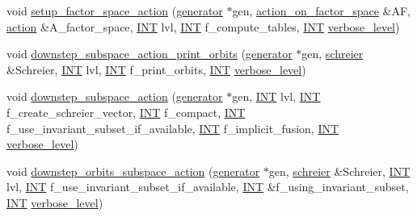 \begin{DoxyCompactItemize}
\item 
void \mbox{\hyperlink{classoracle_a181e076f112ba1f32f5fb4e8abebdb18}{setup\+\_\+factor\+\_\+space\+\_\+action}} (\mbox{\hyperlink{classgenerator}{generator}} $\ast$gen, \mbox{\hyperlink{classaction__on__factor__space}{action\+\_\+on\+\_\+factor\+\_\+space}} \&AF, \mbox{\hyperlink{classaction}{action}} \&A\+\_\+factor\+\_\+space, \mbox{\hyperlink{galois_8h_a09fddde158a3a20bd2dcadb609de11dc}{I\+NT}} lvl, \mbox{\hyperlink{galois_8h_a09fddde158a3a20bd2dcadb609de11dc}{I\+NT}} f\+\_\+compute\+\_\+tables, \mbox{\hyperlink{galois_8h_a09fddde158a3a20bd2dcadb609de11dc}{I\+NT}} \mbox{\hyperlink{simeon_8_c_a818073fbcc2f439e7c56952f67386122}{verbose\+\_\+level}})
\item 
void \mbox{\hyperlink{classoracle_aa23545cebae0fe4f46a689641c775c92}{downstep\+\_\+subspace\+\_\+action\+\_\+print\+\_\+orbits}} (\mbox{\hyperlink{classgenerator}{generator}} $\ast$gen, \mbox{\hyperlink{classschreier}{schreier}} \&Schreier, \mbox{\hyperlink{galois_8h_a09fddde158a3a20bd2dcadb609de11dc}{I\+NT}} lvl, \mbox{\hyperlink{galois_8h_a09fddde158a3a20bd2dcadb609de11dc}{I\+NT}} f\+\_\+print\+\_\+orbits, \mbox{\hyperlink{galois_8h_a09fddde158a3a20bd2dcadb609de11dc}{I\+NT}} \mbox{\hyperlink{simeon_8_c_a818073fbcc2f439e7c56952f67386122}{verbose\+\_\+level}})
\item 
void \mbox{\hyperlink{classoracle_a26f568b84b1ca2c24f619278ac88c407}{downstep\+\_\+subspace\+\_\+action}} (\mbox{\hyperlink{classgenerator}{generator}} $\ast$gen, \mbox{\hyperlink{galois_8h_a09fddde158a3a20bd2dcadb609de11dc}{I\+NT}} lvl, \mbox{\hyperlink{galois_8h_a09fddde158a3a20bd2dcadb609de11dc}{I\+NT}} f\+\_\+create\+\_\+schreier\+\_\+vector, \mbox{\hyperlink{galois_8h_a09fddde158a3a20bd2dcadb609de11dc}{I\+NT}} f\+\_\+compact, \mbox{\hyperlink{galois_8h_a09fddde158a3a20bd2dcadb609de11dc}{I\+NT}} f\+\_\+use\+\_\+invariant\+\_\+subset\+\_\+if\+\_\+available, \mbox{\hyperlink{galois_8h_a09fddde158a3a20bd2dcadb609de11dc}{I\+NT}} f\+\_\+implicit\+\_\+fusion, \mbox{\hyperlink{galois_8h_a09fddde158a3a20bd2dcadb609de11dc}{I\+NT}} \mbox{\hyperlink{simeon_8_c_a818073fbcc2f439e7c56952f67386122}{verbose\+\_\+level}})
\item 
void \mbox{\hyperlink{classoracle_adcf946d772e92646c47cf264764d85a6}{downstep\+\_\+orbits\+\_\+subspace\+\_\+action}} (\mbox{\hyperlink{classgenerator}{generator}} $\ast$gen, \mbox{\hyperlink{classschreier}{schreier}} \&Schreier, \mbox{\hyperlink{galois_8h_a09fddde158a3a20bd2dcadb609de11dc}{I\+NT}} lvl, \mbox{\hyperlink{galois_8h_a09fddde158a3a20bd2dcadb609de11dc}{I\+NT}} f\+\_\+use\+\_\+invariant\+\_\+subset\+\_\+if\+\_\+available, \mbox{\hyperlink{galois_8h_a09fddde158a3a20bd2dcadb609de11dc}{I\+NT}} \&f\+\_\+using\+\_\+invariant\+\_\+subset, \mbox{\hyperlink{galois_8h_a09fddde158a3a20bd2dcadb609de11dc}{I\+NT}} \mbox{\hyperlink{simeon_8_c_a818073fbcc2f439e7c56952f67386122}{verbose\+\_\+level}})

\end{DoxyCompactItemize}
